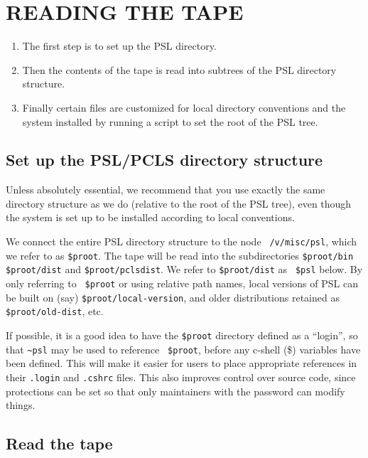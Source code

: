 \section{READING THE TAPE}

\begin{enumerate}

\item The first step is to set up the PSL directory.

\item Then the contents of the tape is read into subtrees of the PSL
directory structure.

\item Finally certain files are customized for local directory conventions
and the system installed by running a script to set the root of the
PSL tree.

\end{enumerate}

\subsection{Set up the PSL/PCLS directory structure}

Unless absolutely essential, we recommend that you use exactly the same
directory structure as we do (relative to the root of the PSL tree),
even though the system is set up to be installed according to local
conventions.

We connect the entire PSL directory structure to the node {\tt
/v/misc/psl}, which we refer to as {\tt \$proot}.  The tape will be
read into the subdirectories {\tt \$proot/bin} {\tt \$proot/dist}
and {\tt \$proot/pclsdist}.  We refer to {\tt \$proot/dist} as {\tt
\$psl} below.  By only referring to {\tt
\$proot} or using
relative path names, local versions of PSL can be built on (say)
{\tt \$proot/local-version}, and older distributions retained as
{\tt \$proot/old-dist}, etc.

If possible, it is a good idea to have the {\tt \$proot} directory defined
as a ``login'', so that {\tt \verb|~|psl} may be used to reference {\tt
\$proot}, before any
c-shell (\$) variables have been defined. This will make it easier for users to
place appropriate references in their {\tt .login} and {\tt .cshrc} files.
This also improves control over source code, since protections can be
set so that only maintainers with the password can modify things.

\subsection{Read the tape}

